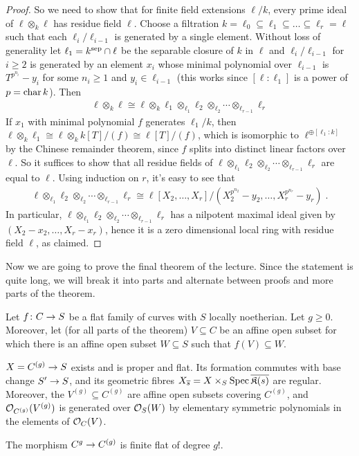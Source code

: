 \documentclass[a4paper,parskip=half,numbers=enddot, DIV=12]{scrreprt}
\renewcommand{\geq}{\geqslant}
\begin{document}
\begin{proof}
	So we need to show that for finite field extensions $\ell/k$, every prime ideal of $\ell\otimes_k\ell$ has residue field $\ell$. Choose a filtration $k=\ell_0\subseteq \ell_1\subseteq\ldots\subseteq\ell_r=\ell$ such that each $\ell_i/\ell_{i-1}$ is generated by a single element. Without loss of generality let $\ell_1=k^{\mathrm{sep}}\cap \ell$ be the separable closure of $k$ in $\ell$ and $\ell_i/\ell_{i-1}$ for $i\geq 2$ is generated by an element $x_i$ whose minimal polynomial over $\ell_{i-1}$ is $T^{p^{n_i}}-y_i$ for some $n_i\geq 1$ and $y_i\in\ell_{i-1}$ (this works since $[\ell:\ell_1]$ is a power of $p=\operatorname{char} k$). Then
	\begin{align*}
		\ell\otimes_ k\ell\cong \ell\otimes_k\ell_1\otimes_{\ell_1}\ell_2\otimes_{\ell_2}\cdots\otimes_{\ell_{r-1}}\ell_r
	\end{align*}
	If $x_1$ with minimal polynomial $f$ generates $\ell_1/k$, then $\ell\otimes_k\ell_1\cong \ell\otimes_kk[T]/(f)\cong \ell[T]/(f)$, which is isomorphic to $\ell^{\oplus[\ell_1:k]}$ by the Chinese remainder theorem, since $f$ splits into distinct linear factors over $\ell$. So it suffices to show that all residue fields of $\ell\otimes_{\ell_1}\ell_2\otimes_{\ell_2}\cdots\otimes_{\ell_{r-1}}\ell_r$ are equal to $\ell$. Using induction on $r$, it's easy to see that 
	\begin{align*}
		\ell\otimes_{\ell_1}\ell_2\otimes_{\ell_2}\cdots\otimes_{\ell_{r-1}}\ell_r\cong \ell[X_2,\ldots,X_r]/\left(X_2^{p^{n_2}}-y_2,\ldots,X_r^{p^{n_r}}-y_r\right)\;.
	\end{align*}
	In particular, $\ell\otimes_{\ell_1}\ell_2\otimes_{\ell_2}\cdots\otimes_{\ell_{r-1}}\ell_r$ has a nilpotent maximal ideal given by $(X_2-x_2,\ldots,X_r-x_r)$, hence it is a zero dimensional local ring with residue field $\ell$, as claimed.
\end{proof}
Now we are going to prove the final theorem of the lecture. Since the statement is quite long, we will break it into parts and alternate between proofs and more parts of the theorem.
\begin{thm}
	Let $f\colon C\morphism S$ be a flat family of curves with $S$ locally noetherian. Let $g\geq 0$. Moreover, let (for all parts of the theorem) $V\subseteq C$ be an affine open subset for which there is an affine open subset $W\subseteq S$ such that $f(V)\subseteq W$.
	\begin{alphanumerate}
		\item $X=C^{(g)}\morphism S$ exists and is proper and flat. Its formation commutes with base change $S'\morphism S$, and its geometric fibres $X_{\overline{s}}=X\times_S\operatorname{Spec} \overline{\mathfrak{K}(s)}$ are regular. Moreover, the $V^{(g)}\subseteq C^{(g)}$ are affine open subsets covering $C^{(g)}$, and $\mathcal{O}_{C^{(g)}}(V^{(g)})$ is generated over $\mathcal{O}_S(W)$ by elementary symmetric polynomials in  the elements of $\mathcal{O}_C(V)$.
		\item The morphism $C^g\morphism C^{(g)}$ is finite flat of degree $g!$. 
	\end{alphanumerate}
\end{thm}
\end{document}
